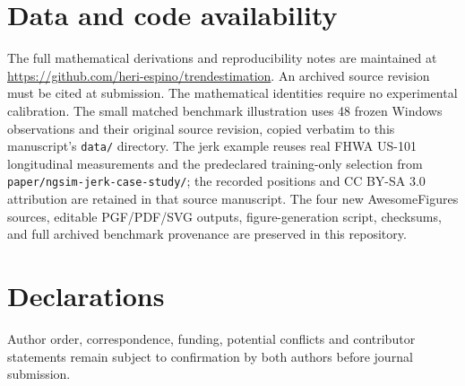 \section*{Data and code availability}
The full mathematical derivations and
reproducibility notes are maintained at
\url{https://github.com/heri-espino/trendestimation}.
An archived source revision must be
cited at submission. The mathematical identities require no
experimental calibration. The small matched
benchmark illustration uses 48 frozen
Windows observations and their original source revision,
copied verbatim to this manuscript's
\texttt{data/} directory.
The jerk example reuses real FHWA US-101 longitudinal
measurements and the predeclared training-only selection
from \texttt{paper/ngsim-jerk-case-study/};
the recorded positions and CC BY-SA 3.0 attribution
are retained in that source manuscript.
The four new AwesomeFigures sources, editable
PGF/PDF/SVG outputs, figure-generation script,
checksums, and full archived benchmark provenance
are preserved in this repository.

\section*{Declarations}
Author order, correspondence,
funding, potential conflicts and
contributor statements remain subject
to confirmation by both authors
before journal submission.
